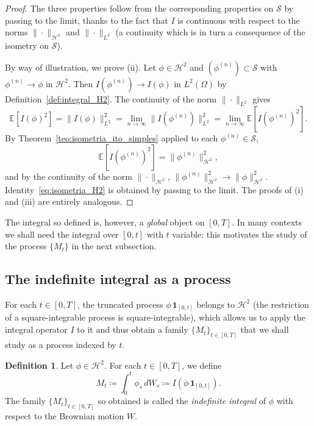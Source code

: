 \documentclass[11pt,a4paper,oneside]{report}
\theoremstyle{plain}
\theoremstyle{definition}
\newtheorem{definicion}[teorema]{Definition}
\theoremstyle{remark}
\newcommand{\E}{\mathbb{E}}
\newcommand{\1}{\mathbf{1}}
\newcommand{\eqdef}{\coloneqq}
\begin{document}
\begin{proof}
The three properties follow from the corresponding properties on
$\mathcal{S}$ by passing to the limit, thanks to the fact that $I$ is
continuous with respect to the norms $\|\cdot\|_{\mathcal{H}^2}$ and
$\|\cdot\|_{L^2}$ (a continuity which is in turn a consequence of the
isometry on $\mathcal{S}$).

By way of illustration, we prove (ii). Let $\phi \in \mathcal{H}^2$
and $(\phi^{(n)}) \subset \mathcal{S}$ with $\phi^{(n)} \to \phi$ in
$\mathcal{H}^2$. Then $I(\phi^{(n)}) \to I(\phi)$ in $L^2(\Omega)$ by
Definition~\ref{def:integral_H2}. The continuity of the norm
$\|\cdot\|_{L^2}$ gives
\begin{equation*}
  \E[I(\phi)^2]
  = \|I(\phi)\|_{L^2}^2
  = \lim_{n\to\infty} \|I(\phi^{(n)})\|_{L^2}^2
  = \lim_{n\to\infty} \E[I(\phi^{(n)})^2].
\end{equation*}
By Theorem~\ref{teo:isometria_ito_simples} applied to each
$\phi^{(n)} \in \mathcal{S}$,
\begin{equation*}
  \E[I(\phi^{(n)})^2] = \|\phi^{(n)}\|_{\mathcal{H}^2}^2,
\end{equation*}
and by the continuity of the norm $\|\cdot\|_{\mathcal{H}^2}$,
$\|\phi^{(n)}\|_{\mathcal{H}^2}^2 \to \|\phi\|_{\mathcal{H}^2}^2$.
Identity~\eqref{eq:isometria_H2} is obtained by passing to the limit.
The proofs of (i) and (iii) are entirely analogous.
\end{proof}

The integral so defined is, however, a \emph{global} object on
$[0, T]$. In many contexts we shall need the integral over $[0, t]$
with $t$ variable: this motivates the study of the process $\{M_t\}$
in the next subsection.

\subsection{The indefinite integral as a process}
\label{subsec:integral_indefinida}

For each $t \in [0, T]$, the truncated process
$\phi\, \mathbf{1}_{[0, t]}$ belongs to $\mathcal{H}^2$ (the
restriction of a square-integrable process is square-integrable),
which allows us to apply the integral operator $I$ to it and thus
obtain a family $\{M_t\}_{t \in [0, T]}$ that we shall study as a
process indexed by $t$.

\begin{definicion}
\label{def:integral_indefinida}
Let $\phi \in \mathcal{H}^2$. For each $t \in [0, T]$, we define
\begin{equation}\label{eq:def_integral_indefinida}
  M_t \eqdef \int_0^t \phi_s\, dW_s
        \eqdef I\!\left(\phi\, \mathbf{1}_{[0, t]}\right).
\end{equation}
The family $\{M_t\}_{t \in [0, T]}$ so obtained is called the
\emph{indefinite integral} of $\phi$ with respect to the Brownian
motion $W$.
\end{definicion}
\end{document}
